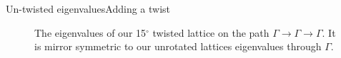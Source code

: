 \documentclass[9pt]{beamer}
\begin{document}
\begin{frame}{Un-twisted eigenvalues}{Adding a twist}
  \begin{figure}
  \centering
    \caption{The eigenvalues of our 15$^\circ$ twisted lattice on the path $\Gamma \rightarrow \Gamma \rightarrow \Gamma$. It is mirror symmetric to our unrotated lattices eigenvalues through $\Gamma$.}
  \end{figure}
\end{frame}
\end{document}
